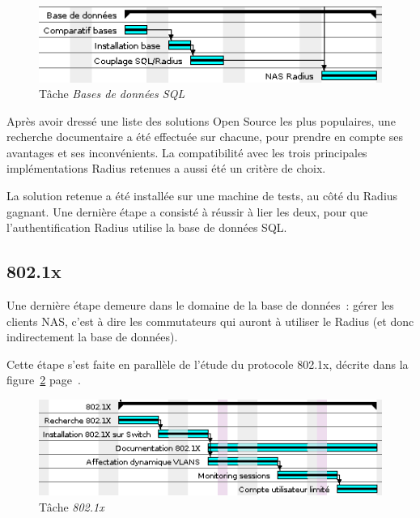 \begin{figure}[!h]
	\begin{center}
		\includegraphics[width=350pt]{img/gantt_sql.png}
	\end{center}
	\caption{Tâche \textit{Bases de données SQL}}
	\label{gantt_sql}
\end{figure}

Après avoir dressé une liste des solutions Open Source les plus populaires, une recherche documentaire a été effectuée sur chacune, pour prendre en compte ses avantages et ses inconvénients. La compatibilité avec les trois principales implémentations Radius retenues a aussi été un critère de choix.

La solution retenue a été installée sur une machine de tests, au côté du Radius gagnant. Une dernière étape a consisté à réussir à lier les deux, pour que l'authentification Radius utilise la base de données SQL.

\subsection{802.1x}

Une dernière étape demeure dans le domaine de la base de données~: gérer les clients NAS, c'est à dire les commutateurs qui auront à utiliser le Radius (et donc indirectement la base de données).

Cette étape s'est faite en parallèle de l'étude du protocole 802.1x, décrite dans la figure~\ref{gantt_dot1x} page~\pageref{gantt_dot1x}.

\begin{figure}[!h]
	\begin{center}
		\includegraphics[width=350pt]{img/gantt_dot1x.png}
	\end{center}
	\caption{Tâche \textit{802.1x}}
	\label{gantt_dot1x}
\end{figure}

